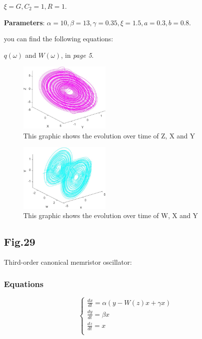 \documentclass[12pt, a4paper]{paper}
\begin{document}
$\xi=G, C_2=1, R=1$.

\textbf{Parameters}: $\alpha =10, \beta =13, \gamma =0.35, \xi=1.5, a=0.3, b=0.8$.

you can find the following equations:

$q(\omega)$ and $W(\omega)$, in \textit{page 5}.
\begin{figure}[h]
\centering
\includegraphics[width=0.4\textwidth]{Fig_26_1.eps}
\caption{This graphic shows the evolution over time of Z, X and Y}
\end{figure}

\begin{figure}[h]
\centering
\includegraphics[width=0.4\textwidth]{26_2.eps}
\caption{This graphic shows the evolution over time of W, X and Y}
\end{figure}


\newpage
\subsection{Fig.29}
Third-order canonical memristor oscillator:
\subsubsection{Equations}
\begin{equation}
\begin{cases}
\frac{dx}{dt}=\alpha(y-W(z)x+\gamma x)
\\
\frac{dy}{dt}=\beta x
\\
\frac{dz}{dt}=x
\\
\end{cases}
\end{equation}
\end{document}
